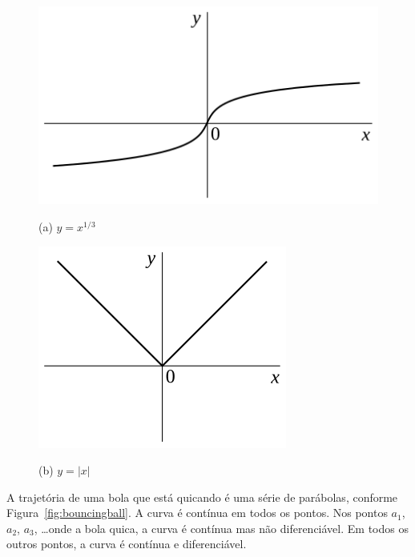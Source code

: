 \begin{figure}
\begin{minipage}{60.91mm}
\centering
\includegraphics{nondifffunc-a}

(a) $y = x^{1/3}$
\end{minipage}
\hfill
\begin{minipage}{43.58mm}
\centering
\includegraphics{nondifffunc-b}

(b) $y = |x|$
\end{minipage}
\caption{}\label{fig:nondifffunc}
\end{figure}

A trajetória de uma bola que está quicando é uma série de parábolas,
conforme Figura~\ref{fig:bouncingball}. A curva é contínua em todos
os pontos. Nos pontos $a_1$, $a_2$, $a_3$, \ldots onde a bola quica,
a curva é contínua mas não diferenciável. Em todos os outros pontos,
a curva é contínua e diferenciável.

